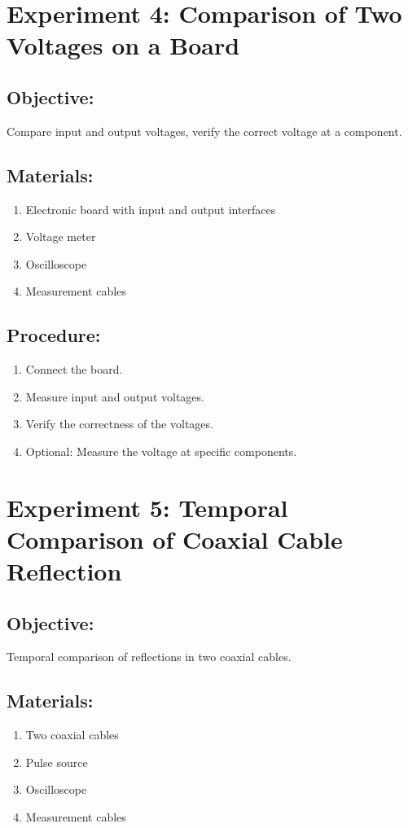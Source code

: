 \documentclass[]{scrreprt}
\begin{document}
    \section*{Experiment 4: Comparison of Two Voltages on a Board}
    \subsection*{Objective:} Compare input and output voltages, verify the correct voltage at a component.
    \subsection*{Materials:}
    \begin{enumerate}
        \item Electronic board with input and output interfaces
        \item Voltage meter
        \item Oscilloscope
        \item Measurement cables
    \end{enumerate}
    \subsection*{Procedure:}
    \begin{enumerate}
        \item Connect the board.
        \item Measure input and output voltages.
        \item Verify the correctness of the voltages.
        \item Optional: Measure the voltage at specific components.
    \end{enumerate}

    \section*{Experiment 5: Temporal Comparison of Coaxial Cable Reflection}
    \subsection*{Objective:} Temporal comparison of reflections in two coaxial cables.
    \subsection*{Materials:}
    \begin{enumerate}
        \item Two coaxial cables
        \item Pulse source
        \item Oscilloscope
        \item Measurement cables
    \end{enumerate}
\end{document}
